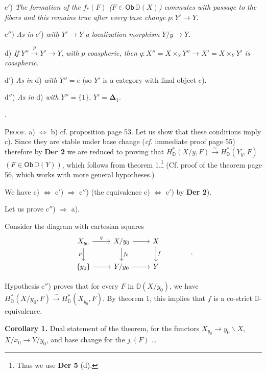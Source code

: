 \documentclass[11pt]{article}
\newcommand{\printedpage}[1]{\marginpar{\footnotesize p.~#1}}
\newcommand{\msp}[1]{\marginpar{\footnotesize [#1]}}
\newcommand{\D}{\mathbb{D}}
\newcommand{\Ob}{\mathsf{Ob}}
\begin{document}
c$'$) \textit{The formation of the} $f_*(F)$ \textit{(}$F \in \Ob\, \D(X)$\textit{) commutes with passage to the fibers and this remains true after every base change} $p : Y' \to Y$.

c$''$) \textit{As in} c$'$) \textit{with} $Y' \to Y$ \textit{a localization morphism} $Y/y \to Y$.

d) \textit{If} $Y'' \overset{p}{\to} Y' \to Y$, \textit{with} $p$ \textit{coaspheric, then} $q : X'' = X \times_Y Y'' \to X' = X \times_Y Y'$ \textit{is coaspheric.}

\printedpage{41}

d$'$) \textit{As in} d) \textit{with} $Y'' = e$ (so $Y'$ is a category with final object $e$).

d$''$) \textit{As in} d) \textit{with} $Y'' = \{1\}$, $Y' = \boldsymbol{\Delta}_1$.

.

\noindent\textsc{Proof}. a) $\Leftrightarrow$ b) cf. proposition page 53. Let us show that these conditions imply c). Since they are stable under base change (\textit{cf.} immediate proof page 55) therefore by \textbf{Der 2} we are reduced to proving that $H^*_{\D}(X/y, F) \overset{\sim}{\to} H^*_{\D}(Y_y, F)$ $(F \in \Ob\, \D(Y))$, which follows from theorem 1.\footnote[30]{Thus we use \textbf{Der 5} (d).} (Cf. proof of the theorem page 56, which works with more general hypotheses.)

We have c) $\Leftrightarrow$ c$'$) $\Rightarrow$ c$''$) (the equivalence c) $\Leftrightarrow$ c$'$) by \textbf{Der 2}).

Let us prove c$''$) $\Rightarrow$ a).

\msp{page 70}

\noindent Consider the diagram with cartesian squares
\[
\begin{tikzcd}
X_{y_0} \arrow[r, "q"] \arrow[d, "p"{swap}] & X/y_0 \arrow[r] \arrow[d, "f_0"] & X \arrow[d, "f"] \\
\{y_0\} \arrow[r] & Y/y_0 \arrow[r] & Y
\end{tikzcd}
\qquad\qquad .
\]

\noindent Hypothesis c$''$) proves that for every $F$ in $\D(X/y_0)$, we have $H^*_{\D}(X/y_0, F) \overset{\sim}{\to} H^*_{\D}(X_{y_0}, F)$. By theorem 1, this implies that $f$ is a co-strict $\D$-equivalence. %

\noindent\textbf{Corollary 1.} Dual statement of the theorem, for the functors $X_{y_0} \to y_0\backslash X$, $X/x_0 \to Y/y_0$, and base change for the $j_!(F)$ \ldots
\end{document}

